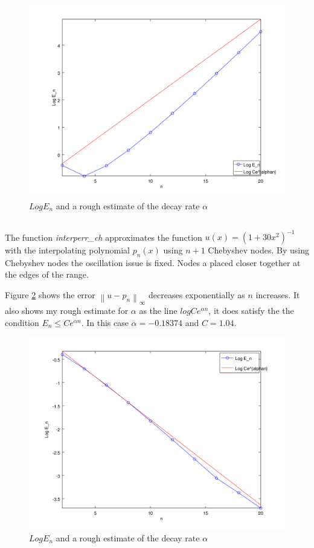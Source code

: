 \documentclass[12pt]{article}
\newcommand{\norm}[1]{\left\lVert#1\right\rVert}
\begin{document}
\noindent
\begin{minipage}{\linewidth}

\end{minipage}

\begin{figure}
    \includegraphics[width=.6\linewidth]{eq_err_alpha}
    \centering
    \caption{$Log E_n$ and a rough estimate of the decay rate $\alpha$}
    \label{fig_eq_err_alpha}
\end{figure}

\subsection{} %

The function \textit{interperr\_ch} approximates the function $u(x) = (1+30x^2)^{-1}$ with the interpolating polynomial $p_n(x)$ using $n+1$ Chebyshev nodes. By using Chebyshev nodes the oscillation issue is fixed. Nodes a placed closer together at the edges of the range.

Figure \ref{fig_ch_err_alpha} shows the error $\norm{u-p_n}_{\infty}$ decreases exponentially as $n$ increases.
It also shows my rough estimate for $\alpha$ as the line $log Ce^{\alpha n}$, it does satisfy the the condition $E_n \le Ce^{\alpha n}$.
In this case $\alpha = -0.18374$ and $C = 1.04$.

\noindent
\begin{minipage}{\linewidth}

\end{minipage}

\begin{figure}
    \includegraphics[width=.6\linewidth]{ch_err_alpha}
    \centering
    \caption{$Log E_n$ and a rough estimate of the decay rate $\alpha$}
    \label{fig_ch_err_alpha}
\end{figure}
\end{document}
